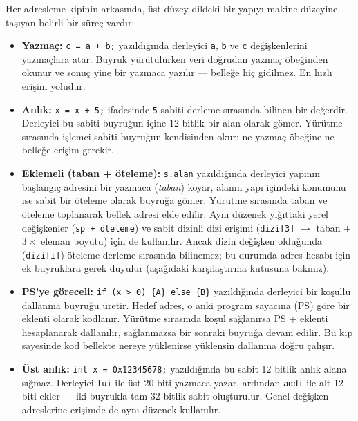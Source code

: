 Her adresleme kipinin arkasında, üst düzey dildeki bir yapıyı makine düzeyine taşıyan belirli bir süreç vardır:

\begin{itemize}[nosep, leftmargin=*]
\item \textbf{Yazmaç:} \texttt{c = a + b;} yazıldığında derleyici \texttt{a}, \texttt{b} ve \texttt{c} değişkenlerini yazmaçlara atar. Buyruk yürütülürken veri doğrudan yazmaç öbeğinden okunur ve sonuç yine bir yazmaca yazılır --- belleğe hiç gidilmez. En hızlı erişim yoludur.

\item \textbf{Anlık:} \texttt{x = x + 5;} ifadesinde \texttt{5} sabiti derleme sırasında bilinen bir değerdir. Derleyici bu sabiti buyruğun içine 12 bitlik bir alan olarak gömer. Yürütme sırasında işlemci sabiti buyruğun kendisinden okur; ne yazmaç öbeğine ne belleğe erişim gerekir.

\item \textbf{Eklemeli (taban + öteleme):} \texttt{s.alan} yazıldığında derleyici yapının başlangıç adresini bir yazmaca (\emph{taban}) koyar, alanın yapı içindeki konumunu ise sabit bir öteleme olarak buyruğa gömer. Yürütme sırasında taban ve öteleme toplanarak bellek adresi elde edilir. Aynı düzenek yığıttaki yerel değişkenler (\texttt{sp + öteleme}) ve sabit dizinli dizi erişimi (\texttt{dizi[3]} $\rightarrow$ taban + $3 \times$ eleman boyutu) için de kullanılır. Ancak dizin değişken olduğunda (\texttt{dizi[i]}) öteleme derleme sırasında bilinemez; bu durumda adres hesabı için ek buyruklara gerek duyulur (aşağıdaki karşılaştırma kutusuna bakınız).

\item \textbf{PS'ye göreceli:} \texttt{if (x > 0) \{A\} else \{B\}} yazıldığında derleyici bir koşullu dallanma buyruğu üretir. Hedef adres, o anki program sayacına (PS) göre bir eklenti olarak kodlanır. Yürütme sırasında koşul sağlanırsa PS + eklenti hesaplanarak dallanılır, sağlanmazsa bir sonraki buyruğa devam edilir. Bu kip sayesinde kod bellekte nereye yüklenirse yüklensin dallanma doğru çalışır.

\item \textbf{Üst anlık:} \texttt{int x = 0x12345678;} yazıldığında bu sabit 12 bitlik anlık alana sığmaz. Derleyici \texttt{lui} ile üst 20 biti yazmaca yazar, ardından \texttt{addi} ile alt 12 biti ekler --- iki buyrukla tam 32 bitlik sabit oluşturulur. Genel değişken adreslerine erişimde de aynı düzenek kullanılır.
\end{itemize}

